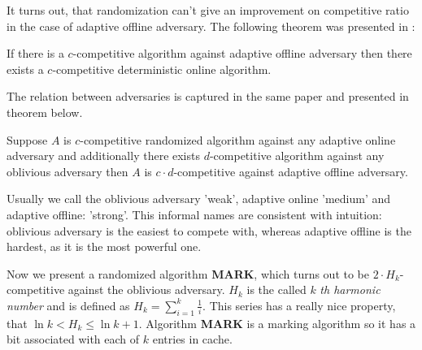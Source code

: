 It turns out, that randomization can't give an improvement on competitive 
ratio in the case of adaptive offline adversary. The following theorem was 
presented in \cite{power}:
\begin{theorem}
If there is a $c$-competitive algorithm against adaptive offline adversary then 
there exists a $c$-competitive deterministic online algorithm. 
\end{theorem}
The relation between adversaries is captured in the same paper and presented in 
theorem below.
\begin{theorem}
Suppose $A$ is $c$-competitive randomized algorithm against any adaptive online 
adversary and additionally there exists $d$-competitive algorithm against any 
oblivious adversary then $A$ is $c \cdot d$-competitive against adaptive 
offline adversary.
\end{theorem}
Usually we call the oblivious adversary 'weak', adaptive online 'medium' and 
adaptive offline: 'strong'. This informal names are consistent with intuition: 
oblivious adversary is the easiest to compete with, whereas adaptive offline is 
the hardest, as it is the most powerful one.

Now we present a randomized algorithm \textbf{MARK}, which turns out to be 
$2 \cdot H_k$-competitive against the oblivious adversary. $H_k$ is the called $k$
\textit{th harmonic number} and is defined as $H_k = \sum^k_{i=1} \frac{1}{i}$. 
This series has a really nice property, that $\ln k < H_k \leq \ln k + 1$. 
Algorithm \textbf{MARK} is a marking algorithm so it has a bit associated with 
each of $k$ entries in cache.

